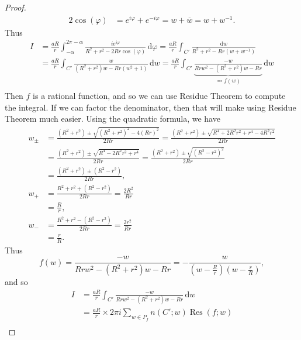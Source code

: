 \documentclass[12pt]{article}
\newcommand\inv[1]{#1^{-1}}
\newcommand\paren[1]{\left( #1 \right)}
\theoremstyle{definition}
\DeclareMathOperator\Res{Res}
\begin{document}
\begin{enumerate}
\begin{proof}
        \begin{align*}
            2 \cos(\varphi) & = e^{i\varphi} + e^{-i\varphi} = w + \overline{w} = w + \inv{w}.
        \end{align*}
        Thus
        \begin{align*}
            I & = \frac{aR}{r} \int_{-\alpha}^{2\pi - \alpha} \frac{ i e^{i \varphi }}{R^2 + r^2 -2Rr \cos \paren{ \varphi } } \, \mathrm{d}\varphi = \frac{aR}{r} \int_{C'} \frac{ \mathrm{d}w }{R^2 + r^2 -Rr \paren{ w + \inv{w} } } \\ 
            & = \frac{aR}{r} \int_{C'} { \frac{ w  }{ \paren{ R^2 + r^2 } w -Rr \paren{ w^2 + 1 } } } \, \mathrm{d}w = \frac{aR}{r} \int_{C'} \underbrace{ \frac{ -w }{ Rr w^2 - \paren{ R^2 + r^2 } w -Rr } }_{ \eqqcolon f(w) } \, \mathrm{d}w  \\ 
        \end{align*}
        Then $f$ is a rational function, and so we can use Residue Theorem to compute the integral. If we can factor the denominator, then that will make using Residue Theorem much easier. Using the quadratic formula, we have 
        \begin{align*}
            w_{\pm} & = \frac{\paren{ R^2 + r^2 } \pm \sqrt{ \paren{ R^2 + r^2 }^2 - 4 \paren{Rr}^2 } }{2Rr} = \frac{\paren{ R^2 + r^2 } \pm \sqrt{ R^4 + 2R^2r^2 + r^4 - 4R^2r^2} }{2Rr} \\ 
            & = \frac{\paren{ R^2 + r^2 } \pm \sqrt{ R^4 - 2R^2r^2 + r^4 } }{2Rr} = \frac{\paren{ R^2 + r^2 } \pm \sqrt{ \paren{ R^2 - r^2 }^2 } }{2Rr} \\ 
            & = \frac{\paren{ R^2 + r^2 } \pm \paren{ R^2 - r^2 } }{2Rr} , \\ 
            w_+ & = \frac{R^2 + r^2 + \paren{ R^2 - r^2 } }{2Rr} = \frac{2R^2}{Rr} \\ 
            & = \frac{R}{r} , \\
            w_{-} & = \frac{R^2 + r^2 - \paren{ R^2 - r^2 } }{2Rr} = \frac{2r^2}{Rr} \\ 
            & = \frac{r}{R} .
        \end{align*}
        Thus 
        \[
            f(w) = \frac{ -w }{ Rr w^2 - \paren{ R^2 + r^2 } w -Rr } = -\frac{w}{ \paren{ w - \frac{R}{r} } \paren{ w - \frac{r}{R} } } , 
        \]
        and so 
        \begin{align*}
            I & = \frac{aR}{r} \int_{C'}  \frac{ -w }{ Rr w^2 - \paren{ R^2 + r^2 } w -Rr } \, \mathrm{d}w \\ 
            & = \frac{aR}{r} \times 2 \pi i \sum\limits_{w \in P_f} n \paren{ C' ; w } \Res \paren{ f ; w } \\ 

\end{align*}
\end{proof}
\end{enumerate}
\end{document}
